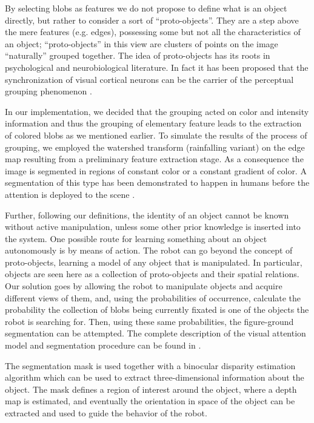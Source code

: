 By selecting blobs as features we do not propose to define what is an object directly, but rather to consider a sort of ``proto-objects''. They are a step above the mere features (e.g. edges), possessing some but not all the characteristics of an object; ``proto-objects'' in this view are clusters of points on the image ``naturally'' grouped together. The idea of proto-objects has its roots in psychological \cite{pylyshyn01indexes} and neurobiological literature. In fact it has been proposed that the synchronization of visual cortical neurons can be the carrier of the perceptual grouping phenomenon \cite{eckhorn88coherent,gray89oscillatory}.

In our implementation, we decided that the grouping acted on color and intensity information and thus the grouping of elementary feature leads to the extraction of colored blobs as we mentioned earlier. To simulate the results of the process of grouping, we employed the watershed transform (rainfalling variant) \cite{smet00rainfalling} on the edge map resulting from a preliminary feature extraction stage. As a consequence the image is segmented in regions of constant color or a constant gradient of color. A segmentation of this type has been demonstrated to happen in humans before the attention is deployed to the scene \cite{driver00segmentation}.

Further, following our definitions, the identity of an object cannot be known without active manipulation, unless some other prior knowledge is inserted into the system. One possible route for learning something about an object autonomously is by means of action. The robot can go beyond the concept of proto-objects, learning a model of any object that is manipulated. In particular, objects are seen here as a collection of proto-objects and their spatial relations. Our solution goes by allowing the robot to manipulate objects and acquire different views of them, and, using the probabilities of occurrence, calculate the probability the collection of blobs being currently fixated is one of the objects the robot is searching for. Then, using these same probabilities, the figure-ground segmentation can be attempted. The complete description of the visual attention model and segmentation procedure can be found in \cite{orabona05object}.

The segmentation mask is used together with a binocular disparity estimation algorithm which can be used to extract three-dimensional information about the object. The mask defines a region of interest around the object, where a depth map is estimated, and eventually the orientation in space of the object can be extracted and used to guide the behavior of the robot.

